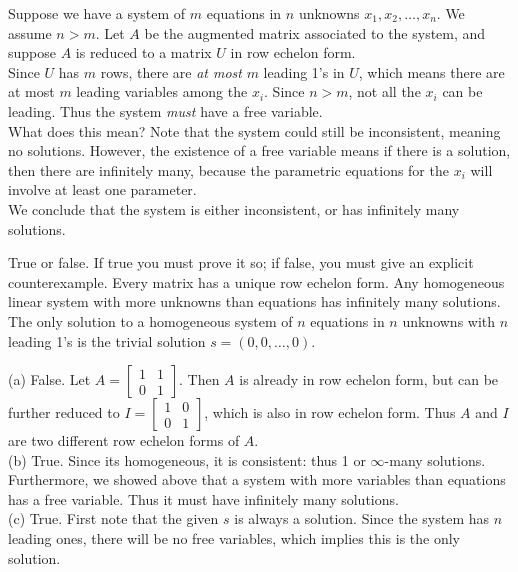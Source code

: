 \begin{solution}
\noindent Suppose we have a system of $m$ equations in $n$ unknowns $x_1,x_2,\dots, x_n$. We assume $n>m$. Let $A$ be the augmented matrix associated to the system, and suppose $A$ is reduced to a matrix $U$ in row echelon form. 
\\
Since $U$ has $m$ rows, there are {\em at most} $m$ leading 1's in $U$, which means there are at most $m$ leading variables among the $x_i$. Since $n>m$, not all the $x_i$ can be leading. Thus the system {\em must} have a free variable. 
\\
What does this mean? Note that the system could still be inconsistent, meaning no solutions. However, the existence of a free variable means if there is a solution, then there are infinitely many, because the parametric equations for the $x_i$ will involve at least one parameter. 
\\
We conclude that the system is either inconsistent, or has infinitely many solutions. 
\end{solution}
\ii
\noindent
True or false. If true you must prove it so; if false, you must give an explicit counterexample. 
\bb
\ii Every matrix has a unique row echelon form. 
\ii Any homogeneous linear system with more unknowns than equations has infinitely many solutions. 
\ii The only solution to a homogeneous system of $n$ equations in $n$ unknowns with $n$ leading 1's is the trivial solution $s=(0,0,\dots,0)$. 
\ee
 \begin{solution}\noindent
(a) False. Let $A=\begin{bmatrix}1&1\\ 0&1 \end{bmatrix}$. Then $A$ is already in row echelon form, but can be further reduced to $I=\begin{bmatrix}1&0\\0&1\end{bmatrix}$, which is also in row echelon form. Thus $A$ and $I$ are two different row echelon forms of $A$.
\\
(b) True. Since its homogeneous, it is consistent: thus 1 or $\infty$-many solutions. Furthermore, we showed above that a system with more variables than equations has a free variable. Thus it must have infinitely many solutions. 
\\
(c) True. First note that the given $s$ is always a solution. Since the system has $n$ leading ones, there will be no free variables, which implies this is the only solution. 
\end{solution}
